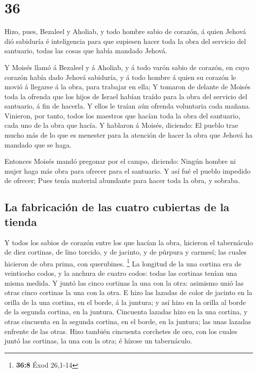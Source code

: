 \hypertarget{section-35}{%
\section{36}\label{section-35}}

 Hizo, pues, Bezaleel y Aholiab, y todo hombre sabio de
corazón, á quien Jehová dió sabiduría é inteligencia para que supiesen
hacer toda la obra del servicio del santuario, todas las cosas que había
mandado Jehová.

 Y Moisés llamó á Bezaleel y á Aholiab, y á todo varón sabio
de corazón, en cuyo corazón había dado Jehová sabiduría, y á todo hombre
á quien su corazón le movió á llegarse á la obra, para trabajar en ella;
 Y tomaron de delante de Moisés toda la ofrenda que los
hijos de Israel habían traído para la obra del servicio del santuario, á
fin de hacerla. Y ellos le traían aún ofrenda voluntaria cada mañana.
 Vinieron, por tanto, todos los maestros que hacían toda la
obra del santuario, cada uno de la obra que hacía.  Y
hablaron á Moisés, diciendo: El pueblo trae mucho más de lo que es
menester para la atención de hacer la obra que Jehová ha mandado que se
haga.

 Entonces Moisés mandó pregonar por el campo, diciendo:
Ningún hombre ni mujer haga más obra para ofrecer para el santuario. Y
así fué el pueblo impedido de ofrecer;  Pues tenía material
abundante para hacer toda la obra, y sobraba.

\hypertarget{la-fabricaciuxf3n-de-las-cuatro-cubiertas-de-la-tienda}{%
\subsection{La fabricación de las cuatro cubiertas de la
tienda}\label{la-fabricaciuxf3n-de-las-cuatro-cubiertas-de-la-tienda}}

 Y todos los sabios de corazón entre los que hacían la obra,
hicieron el tabernáculo de diez cortinas, de lino torcido, y de jacinto,
y de púrpura y carmesí; las cuales hicieron de obra prima, con
querubines. \footnote{\textbf{36:8} Éxod 26,1-14}  La
longitud de la una cortina era de veintiocho codos, y la anchura de
cuatro codos: todas las cortinas tenían una misma medida. 
Y juntó las cinco cortinas la una con la otra: asimismo unió las otras
cinco cortinas la una con la otra.  E hizo las lazadas de
color de jacinto en la orilla de la una cortina, en el borde, á la
juntura; y así hizo en la orilla al borde de la segunda cortina, en la
juntura.  Cincuenta lazadas hizo en la una cortina, y otras
cincuenta en la segunda cortina, en el borde, en la juntura; las unas
lazadas enfrente de las otras.  Hizo también cincuenta
corchetes de oro, con los cuales juntó las cortinas, la una con la otra;
é hízose un tabernáculo.

